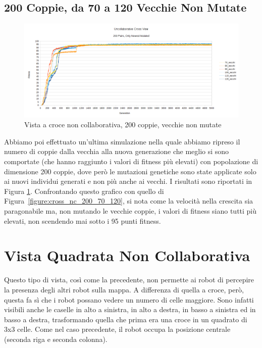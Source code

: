 \subsection{200 Coppie, da 70 a 120 Vecchie Non Mutate}
\begin{figure}[ht]
	\centering
	\includegraphics[scale=0.7,angle=90]{imgs/cross_nc_200_pairs_70_120_old_not_mutated.png}
	\caption{Vista a croce non collaborativa, 200 coppie, vecchie non mutate}
	\label{figure:cross_nc_200_70_120_non}
\end{figure}
Abbiamo poi effettuato un'ultima simulazione nella quale abbiamo ripreso il
numero di coppie dalla vecchia alla nuova generazione che meglio si sono
comportate (che hanno raggiunto i valori di fitness più elevati) con popolazione
di dimensione 200 coppie, dove però le mutazioni genetiche sono state applicate
solo ai nuovi individui generati e non più anche ai vecchi.\newline
I risultati sono riportati in Figura
\ref{figure:cross_nc_200_70_120_non}. Confrontando questo grafico con quello di
Figura~\ref{figure:cross_nc_200_70_120}, si nota come la velocità nella crescita
sia paragonabile ma, non mutando le vecchie coppie, i valori di fitness siano
tutti più elevati, non scendendo mai sotto i 95 punti fitness.



\clearpage



\section{Vista Quadrata Non Collaborativa}
Questo tipo di vista, così come la precedente, non permette ai robot di
percepire la presenza degli altri robot sulla mappa. A differenza di quella a
croce, però, questa fa sì che i robot possano vedere un numero di celle
maggiore. Sono infatti visibili anche le caselle in alto a sinistra, in alto a
destra, in basso a sinistra ed in basso a destra, trasformando quella che prima
era una croce in un quadrato di 3x3 celle. Come nel caso precedente, il robot
occupa la posizione centrale (seconda riga e seconda colonna).

